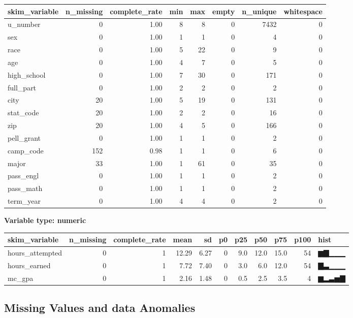 \documentclass[]{article}
\newenvironment{Shaded}{\begin{snugshade}}{\end{snugshade}}
\newcommand{\DecValTok}[1]{\textcolor[rgb]{0.00,0.00,0.81}{#1}}
\newcommand{\KeywordTok}[1]{\textcolor[rgb]{0.13,0.29,0.53}{\textbf{#1}}}
\newcommand{\NormalTok}[1]{#1}
\newcommand{\OperatorTok}[1]{\textcolor[rgb]{0.81,0.36,0.00}{\textbf{#1}}}
\newcommand{\StringTok}[1]{\textcolor[rgb]{0.31,0.60,0.02}{#1}}
\begin{document}
\begin{longtable}[]{@{}lrrrrrrr@{}}
\toprule
skim\_variable & n\_missing & complete\_rate & min & max & empty &
n\_unique & whitespace\tabularnewline
\midrule
\endhead
u\_number & 0 & 1.00 & 8 & 8 & 0 & 7432 & 0\tabularnewline
sex & 0 & 1.00 & 1 & 1 & 0 & 4 & 0\tabularnewline
race & 0 & 1.00 & 5 & 22 & 0 & 9 & 0\tabularnewline
age & 0 & 1.00 & 4 & 7 & 0 & 5 & 0\tabularnewline
high\_school & 0 & 1.00 & 7 & 30 & 0 & 171 & 0\tabularnewline
full\_part & 0 & 1.00 & 2 & 2 & 0 & 2 & 0\tabularnewline
city & 20 & 1.00 & 5 & 19 & 0 & 131 & 0\tabularnewline
stat\_code & 20 & 1.00 & 2 & 2 & 0 & 16 & 0\tabularnewline
zip & 20 & 1.00 & 4 & 5 & 0 & 166 & 0\tabularnewline
pell\_grant & 0 & 1.00 & 1 & 1 & 0 & 2 & 0\tabularnewline
camp\_code & 152 & 0.98 & 1 & 1 & 0 & 6 & 0\tabularnewline
major & 33 & 1.00 & 1 & 61 & 0 & 35 & 0\tabularnewline
pass\_engl & 0 & 1.00 & 1 & 1 & 0 & 2 & 0\tabularnewline
pass\_math & 0 & 1.00 & 1 & 1 & 0 & 2 & 0\tabularnewline
term\_year & 0 & 1.00 & 4 & 4 & 0 & 2 & 0\tabularnewline
\bottomrule
\end{longtable}

\textbf{Variable type: numeric}

\begin{longtable}[]{@{}lrrrrrrrrrl@{}}
\toprule
skim\_variable & n\_missing & complete\_rate & mean & sd & p0 & p25 &
p50 & p75 & p100 & hist\tabularnewline
\midrule
\endhead
hours\_attempted & 0 & 1 & 12.29 & 6.27 & 0 & 9.0 & 12.0 & 15.0 & 54 &
▆▇▁▁▁\tabularnewline
hours\_earned & 0 & 1 & 7.72 & 7.40 & 0 & 3.0 & 6.0 & 12.0 & 54 &
▇▃▁▁▁\tabularnewline
mc\_gpa & 0 & 1 & 2.16 & 1.48 & 0 & 0.5 & 2.5 & 3.5 & 4 &
▆▂▃▅▇\tabularnewline
\bottomrule
\end{longtable}

\hypertarget{missing-values-and-data-anomalies}{%
\subsection{Missing Values and data
Anomalies}\label{missing-values-and-data-anomalies}}

\begin{Shaded}
\end{Shaded}
\end{document}
